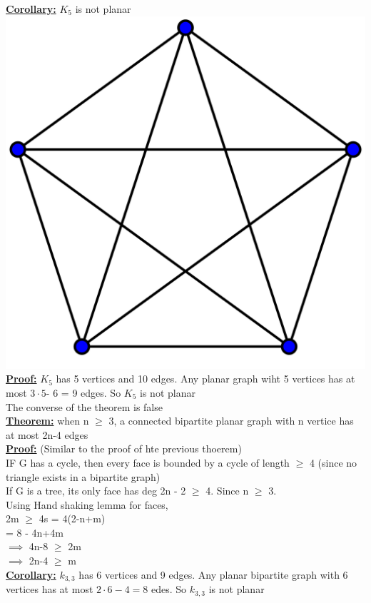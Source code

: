 \documentclass[12pt]{article}
\newcommand{\myt}[1]{\textbf{\underline{#1}}}
\begin{document}
	\myt{Corollary:} $K_5$ is not planar\\
	\includegraphics[scale=0.5]{k5.png}\\
	
	\myt{Proof:} $K_5$ has 5 vertices and 10 edges. Any planar graph wiht 5 vertices has at most $3 \cdot 5$- 6 = 9 edges. So $K_5$ is not planar\\
	
	The converse of the theorem is false\\
	
	\myt{Theorem:} when n $\geq$ 3, a connected bipartite planar graph with n vertice has at most 2n-4 edges\\
	
	\myt{Proof:} (Similar to the proof of hte previous thoerem)\\
	IF G has a cycle, then every face is bounded by a cycle of length $\geq$ 4 (since no triangle exists in a bipartite graph)\\
	If G is a tree, its only face has deg 2n - 2 $\geq$ 4. Since n $\geq$ 3. \\
	Using Hand shaking lemma for faces,\\
	 2m $\geq$ 4s = 4(2-n+m)\\
	 = 8 - 4n+4m\\
	 $\implies$ 4n-8 $\geq$ 2m\\
	 $\implies$ 2n-4 $\geq$ m\\
	 
	 \myt{Corollary:} $k_{3,3}$ has 6 vertices and 9 edges. Any planar bipartite graph with 6 vertices has at most $2 \cdot 6 - 4 = 8$ edes. So $k_{3,3}$ is not planar\\
	
	
	
	
\end{document}

